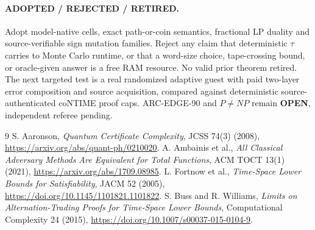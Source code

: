\documentclass[11pt]{article}
\begin{document}
\paragraph{ADOPTED / REJECTED / RETIRED.}
Adopt model-native cells, exact path-or-coin semantics, fractional LP duality and source-verifiable sign mutation families. Reject any claim that deterministic $\tau$ carries to Monte Carlo runtime, or that a word-size choice, tape-crossing bound, or oracle-given answer is a free RAM resource. No valid prior theorem retired. The next targeted test is a real randomized adaptive guest with paid two-layer error composition and source acquisition, compared against deterministic source-authenticated coNTIME proof caps. ARC-EDGE-90 and $P\ne NP$ remain \textbf{OPEN}, independent referee pending.

\begin{thebibliography}{9}
 S. Aaronson, \emph{Quantum Certificate Complexity}, JCSS 74(3) (2008), \url{https://arxiv.org/abs/quant-ph/0210020}.
 A. Ambainis et al., \emph{All Classical Adversary Methods Are Equivalent for Total Functions}, ACM TOCT 13(1) (2021), \url{https://arxiv.org/abs/1709.08985}.
 L. Fortnow et al., \emph{Time-Space Lower Bounds for Satisfiability}, JACM 52 (2005), \url{https://doi.org/10.1145/1101821.1101822}.
 S. Buss and R. Williams, \emph{Limits on Alternation-Trading Proofs for Time-Space Lower Bounds}, Computational Complexity 24 (2015), \url{https://doi.org/10.1007/s00037-015-0104-9}.
\end{thebibliography}
\end{document}
